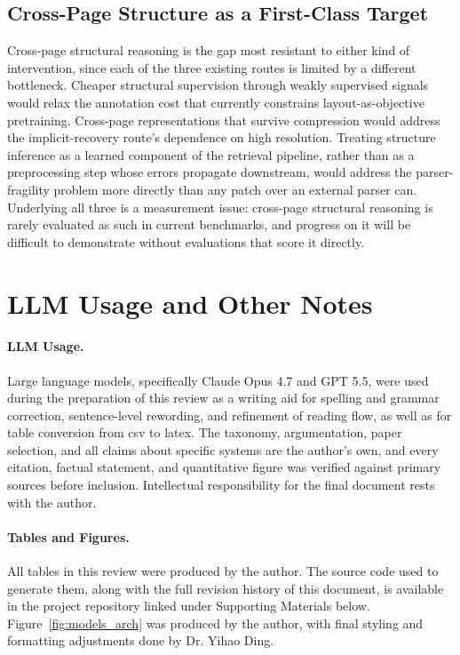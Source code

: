 \documentclass[11pt]{article}
\begin{document}
\subsection{Cross-Page Structure as a First-Class Target}
Cross-page structural reasoning is the gap most resistant to either kind of intervention, since each of the three existing routes is limited by a different bottleneck. Cheaper structural supervision through weakly supervised signals would relax the annotation cost that currently constrains layout-as-objective pretraining. Cross-page representations that survive compression would address the implicit-recovery route's dependence on high resolution. Treating structure inference as a learned component of the retrieval pipeline, rather than as a preprocessing step whose errors propagate downstream, would address the parser-fragility problem more directly than any patch over an external parser can. Underlying all three is a measurement issue: cross-page structural reasoning is rarely evaluated as such in current benchmarks, and progress on it will be difficult to demonstrate without evaluations that score it directly.

\section*{LLM Usage and Other Notes}

\paragraph{LLM Usage.}
Large language models, specifically Claude Opus 4.7 and GPT 5.5, were used during the preparation of this review as a writing aid for spelling and grammar correction, sentence-level rewording, and refinement of reading flow, as well as for table conversion from csv to latex. The taxonomy, argumentation, paper selection, and all claims about specific systems are the author's own, and every citation, factual statement, and quantitative figure was verified against primary sources before inclusion. Intellectual responsibility for the final document rests with the author.

\paragraph{Tables and Figures.}
All tables in this review were produced by the author. The source code used to generate them, along with the full revision history of this document, is available in the project repository linked under Supporting Materials below. Figure~\ref{fig:models_arch} was produced by the author, with final styling and formatting adjustments done by Dr. Yihao Ding.
\end{document}
